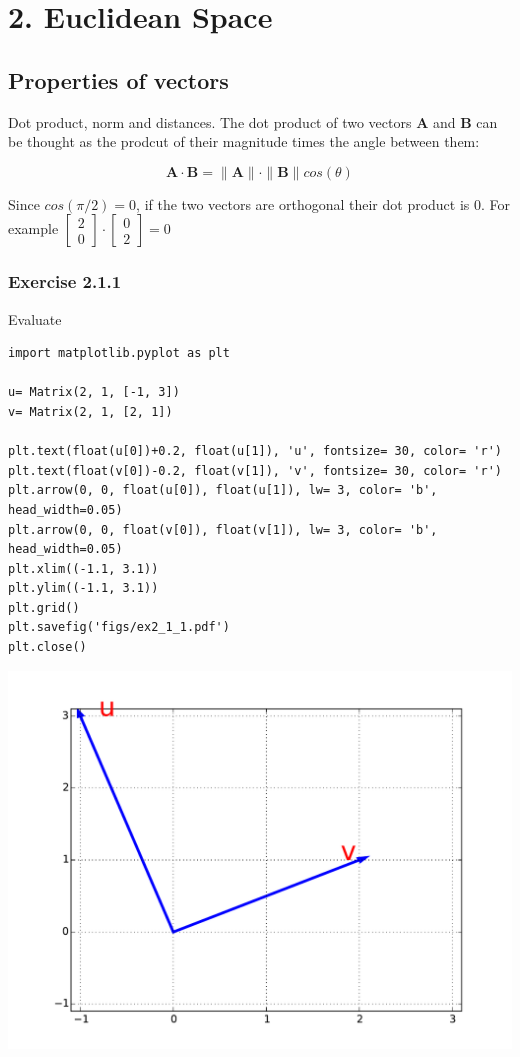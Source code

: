 \section{2. Euclidean Space}

\subsection{Properties of vectors}

Dot product, norm and distances. The dot product of two vectors \textbf{A} and
\textbf{B} can be thought as the prodcut of their magnitude times the angle between
them:

$$\mathbf{A} \cdot \mathbf{B} = \|\mathbf{A}\| \cdot \|\mathbf{B}\|cos(\theta)$$

Since $cos(\pi/2) = 0$, if the two vectors are orthogonal their dot product is
0. For example $\left[\begin{matrix}2\\0\end{matrix}\right] \cdot \left[\begin{matrix}0\\2\end{matrix}\right] = 0$

\subsubsection{Exercise 2.1.1}

Evaluate

\begin{verbatim}
import matplotlib.pyplot as plt

u= Matrix(2, 1, [-1, 3])
v= Matrix(2, 1, [2, 1])

plt.text(float(u[0])+0.2, float(u[1]), 'u', fontsize= 30, color= 'r')
plt.text(float(v[0])-0.2, float(v[1]), 'v', fontsize= 30, color= 'r')
plt.arrow(0, 0, float(u[0]), float(u[1]), lw= 3, color= 'b', head_width=0.05)
plt.arrow(0, 0, float(v[0]), float(v[1]), lw= 3, color= 'b', head_width=0.05)
plt.xlim((-1.1, 3.1))
plt.ylim((-1.1, 3.1))
plt.grid()
plt.savefig('figs/ex2_1_1.pdf')
plt.close()
\end{verbatim}

\includegraphics[width=\linewidth]{figs/ex2_1_1.pdf}


